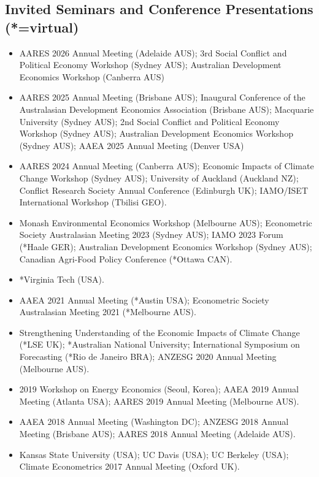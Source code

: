 \documentclass[10pt]{article}
\begin{document}
	\subsection*{Invited Seminars and Conference Presentations (*=virtual)}
	\begin{itemize}
		\item {} AARES 2026 Annual Meeting (Adelaide AUS); 3rd Social Conflict and Political Economy Workshop (Sydney AUS); Australian Development Economics Workshop (Canberra AUS)
		\item {} AARES 2025 Annual Meeting (Brisbane AUS); Inaugural Conference of the Australasian Development Economics Association (Brisbane AUS); Macquarie University (Sydney AUS); 2nd Social Conflict and Political Economy Workshop (Sydney AUS); Australian Development Economics Workshop (Sydney AUS); AAEA 2025 Annual Meeting (Denver USA)
		\item {} AARES 2024 Annual Meeting (Canberra AUS); Economic Impacts of Climate Change Workshop (Sydney AUS); University of Auckland (Auckland NZ); Conflict Research Society Annual Conference (Edinburgh UK); IAMO/ISET International Workshop (Tbilisi GEO).
		\item {} Monash Environmental Economics Workshop (Melbourne AUS); Econometric Society Australasian Meeting 2023 (Sydney AUS); IAMO 2023 Forum (*Haale GER); Australian Development Economics Workshop (Sydney AUS); Canadian Agri-Food Policy Conference (*Ottawa CAN).
		\item {} *Virginia Tech (USA).
		\item {} AAEA 2021 Annual Meeting (*Austin USA); Econometric Society Australasian Meeting 2021 (*Melbourne AUS).
		\item {} Strengthening Understanding of the Economic Impacts of Climate Change (*LSE UK); *Australian National University; International Symposium on Forecasting (*Rio de Janeiro BRA); ANZESG 2020 Annual Meeting (Melbourne AUS).
		\item {} 2019 Workshop on Energy Economics (Seoul, Korea); AAEA 2019 Annual Meeting (Atlanta USA); AARES 2019 Annual Meeting (Melbourne AUS).
		\item {} AAEA 2018 Annual Meeting (Washington DC); ANZESG 2018 Annual Meeting (Brisbane AUS); AARES 2018 Annual Meeting (Adelaide AUS).
		\item {} Kansas State University (USA); UC Davis (USA); UC Berkeley (USA); Climate Econometrics 2017 Annual Meeting (Oxford UK).

\end{itemize}
\end{document}
